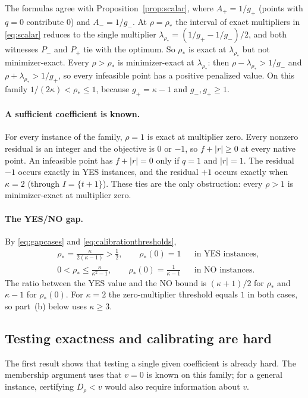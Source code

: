The formulas agree with Proposition~\ref{prop:scalar}, where
$A_+=1/g_+$ (points with $q=0$ contribute $0$) and $A_-=1/g_-$. At
$\rho=\rho_*$ the interval of exact multipliers in \eqref{eq:scalar}
reduces to the single multiplier
$\lambda_{\rho_*}=(1/g_+-1/g_-)/2$, and both witnesses $P_-$ and $P_+$ tie
with the optimum. So $\rho_*$ is exact at $\lambda_{\rho_*}$ but not
minimizer-exact. Every $\rho>\rho_*$ is minimizer-exact at
$\lambda_{\rho_*}$: then $\rho-\lambda_{\rho_*}>1/g_-$ and
$\rho+\lambda_{\rho_*}>1/g_+$, so every infeasible point has a positive
penalized value. On this family $1/(2\kappa)<\rho_*\le1$, because
$g_+=\kappa-1$ and $g_-,g_+\ge1$.

\paragraph{A sufficient coefficient is known.}
For every instance of the family, $\rho=1$ is exact at multiplier zero.
Every nonzero residual is an integer and the objective is $0$ or $-1$, so
$f+|r|\ge0$ at every native point. An infeasible point has $f+|r|=0$ only
if $q=1$ and $|r|=1$. The residual $-1$ occurs exactly in YES instances,
and the residual $+1$ occurs exactly when $\kappa=2$ (through
$I=\{t+1\}$). These ties are the only obstruction: every $\rho>1$ is
minimizer-exact at multiplier zero.

\paragraph{The YES/NO gap.}
By \eqref{eq:gapcases} and \eqref{eq:calibrationthresholds},
\begin{equation}\label{eq:thresholdgap}
 \begin{aligned}
 &\rho_*=\frac{\kappa}{2(\kappa-1)}>\frac12,\qquad
 \rho_*(0)=1 &&\text{in YES instances},\\
 &0<\rho_*\le\frac{\kappa}{\kappa^2-1},\qquad
 \rho_*(0)=\frac1{\kappa-1} &&\text{in NO instances}.
 \end{aligned}
\end{equation}
The ratio between the YES value and the NO bound is $(\kappa+1)/2$ for
$\rho_*$ and $\kappa-1$ for $\rho_*(0)$. For $\kappa=2$ the zero-multiplier
threshold equals $1$ in both cases, so part~(b) below uses $\kappa\ge3$.

\subsection{Testing exactness and calibrating are hard}
The first result shows that testing a single given coefficient is already
hard. The membership argument uses that $v=0$ is known on this family; for
a general instance, certifying $D_\rho<v$ would also require
information about $v$.

